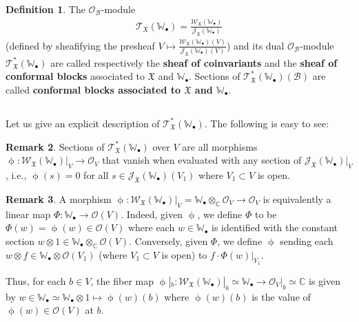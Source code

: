 \documentclass[12pt,a4paper,notitlepage]{article}
\theoremstyle{definition}
\newtheorem{df}{Definition}[section]
\newtheorem{rem}[df]{Remark}
\theoremstyle{plain}
\newcommand{\fk}{\mathfrak}
\newcommand{\mc}{\mathcal}
\newcommand{\scr}{\mathscr}
\newcommand{\blt}{\bullet}
\newcommand{\Wbb}{\mathbb W}
\newcommand{\Cbb}{\mathbb C}
\numberwithin{equation}{section}
\begin{document}
\begin{df}
The $\scr O_{\mc B}$-module \index{T@$\scr T_{\fk X}(\Wbb_\blt),\scr T_{\fk X}^*(\Wbb_\blt)$}
\begin{align}
\scr T_{\fk X}(\Wbb_\blt)=\frac{\scr W_{\fk X}(\Wbb_\blt)}{\scr J_{\fk X}(\Wbb_\blt)}
\end{align}
(defined by sheafifying the presheaf $V\mapsto \frac{\scr W_{\fk X}(\Wbb_\blt)(V)}{\scr J_{\fk X}(\Wbb_\blt)(V)}$) and its dual $\scr O_{\mc B}$-module $\scr T_{\fk X}^*(\Wbb_\blt)$ are called respectively the \textbf{sheaf of coinvariants} and the \textbf{sheaf of conformal blocks} associated to $\fk X$ and $\Wbb_\blt$. Sections of $\scr T_{\fk X}^*(\Wbb_\blt)(\mc B)$ are called \textbf{conformal blocks associated to $\fk X$ and $\Wbb_\blt$}.
\end{df} 



\subsection{}

Let us give an explicit description of $\scr T_{\fk X}^*(\Wbb_\blt)$. The following is easy to see:
\begin{rem}
Sections of $\scr T_{\fk X}^*(\Wbb_\blt)$ over $V$ are all morphisms $\upphi:\scr W_{\fk X}(\Wbb_\blt)|_V\rightarrow\scr O_V$ that vanish when evaluated with any section of $\scr J_{\fk X}(\Wbb_\blt)|_V$, i.e., $\upphi(s)=0$ for all $s\in\scr J_{\fk X}(\Wbb_\blt)(V_1)$ where $V_1\subset V$ is open.
\end{rem}



\begin{rem}
A morphism $\upphi:\scr W_{\fk X}(\Wbb_\blt)|_V=\Wbb_\blt\otimes_\Cbb\scr O_V\rightarrow\scr O_V$ is equivalently a linear map $\Phi:\Wbb_\blt\rightarrow\scr O(V)$. Indeed, given $\upphi$, we define $\Phi$ to be $\Phi(w)=\upphi(w)\in\scr O(V)$ where each $w\in\Wbb_\blt$ is identified with the constant section $w\otimes 1\in\Wbb_\blt\otimes_\Cbb\scr O(V)$. Conversely, given $\Phi$, we define $\upphi$ sending each $w\otimes f\in\Wbb_\blt\otimes\scr O(V_1)$ (where $V_1\subset V$ is open) to $f\cdot \Phi(w)|_{V_1}$.

Thus, for each $b\in V$, the fiber map $\upphi|_b:\scr W_{\fk X}(\Wbb_\blt)|_b\simeq\Wbb_\blt\rightarrow \scr O_V|_b\simeq\Cbb$ is given by $w\in\Wbb_\blt\simeq\Wbb_\blt\otimes 1\mapsto \upphi(w)(b)$ where $\upphi(w)(b)$ is the value of $\upphi(w)\in\scr O(V)$ at $b$.  \hfill\qedsymbol
\end{rem}
\end{document}
